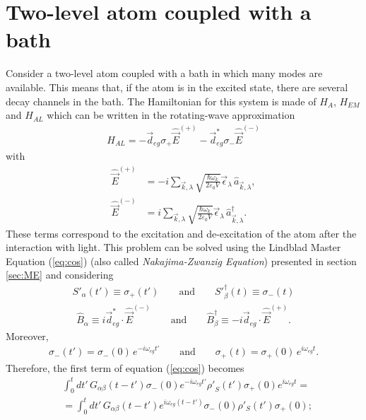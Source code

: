 \section{Two-level atom coupled with a bath}

Consider a two-level atom coupled with a bath in which many modes are available. This means that, if the atom is in the excited state, there are several decay channels in the bath. The Hamiltonian for this system is made of $H_A$, $H_{EM}$ and $H_{AL}$ which can be written in the rotating-wave approximation
\begin{align}
    H_{AL} = -\vec{d}_{eg} \sigma_+ \hat{\vec{E}}^{(+)} - \vec{d}_{eg}^* \sigma_- \hat{\vec{E}}^{(-)}
\end{align}
with
\begin{align}
    \hat{\vec{E}}^{(+)} &= -i \sum_{\vec{k}, \lambda} \sqrt{\frac{\hbar \omega_k}{2 \varepsilon_0 V}} \vec{\epsilon}_\lambda \,\hat{a}_{\vec{k},\lambda}, \\
    \hat{\vec{E}}^{(-)} &= i \sum_{\vec{k}, \lambda} \sqrt{\frac{\hbar \omega_k}{2 \varepsilon_0 V}} \vec{\epsilon}_\lambda \,  \hat{a}_{\vec{k},\lambda}^\dagger.
\end{align}
These terms correspond to the excitation and de-excitation of the atom after the interaction with light.
This problem can be solved using the Lindblad Master Equation (\ref{eq:cos}) (also called \textit{Nakajima-Zwanzig Equation}) presented in section \ref{sec:ME} and considering
\begin{align*}
    {S'}_\alpha(t') \equiv \sigma_+(t') \qquad  \text{and} \qquad {S'}_\beta^\dagger(t) \equiv \sigma_-(t)
\end{align*}
\begin{align*}
    \hat{B}_\alpha \equiv  i \vec{d}_{eg}^* \cdot \hat{\vec{E}}^{(-)}  \qquad \text{and} \qquad \hat{B}_\beta^\dagger \equiv - i \vec{d}_{eg} \cdot \hat{\vec{E}}^{(+)}. 
\end{align*}
Moreover, 
\begin{align*}
    \sigma_-(t') = \sigma_-(0) \, e^{-i \omega_{eg} t'} \qquad \text{and} \qquad \sigma_+(t) = \sigma_+(0) \, e^{i \omega_{eg} t}. 
\end{align*}
Therefore, the first term of equation (\ref{eq:cos}) becomes
\begin{align*}
    & \int_0^t dt'\, G_{\alpha\beta}(t-t')  \sigma_-(0)  e^{-i \omega_{eg} t'} {\rho'}_S(t') \sigma_+(0)  e^{i \omega_{eg} t} = \\
    & = \int_0^t dt'\,  G_{\alpha\beta}(t-t') e^{i \omega_{eg}(t-t')} \sigma_-(0) \rho'_S(t') \sigma_+(0);
\end{align*}
